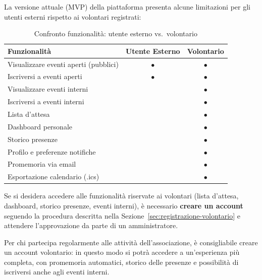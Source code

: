 \documentclass[a4paper,11pt,oneside]{book}
\begin{document}
La versione attuale (MVP) della piattaforma presenta alcune limitazioni per gli utenti esterni rispetto ai volontari registrati:

\begin{table}[htbp]
\centering
\caption{Confronto funzionalit\`a: utente esterno vs.\ volontario}
\label{tab:confronto-esterno-volontario}
\begin{tabularx}{\textwidth}{X c c}
\toprule
\textbf{Funzionalit\`a} & \textbf{Utente Esterno} & \textbf{Volontario} \\
\midrule
Visualizzare eventi aperti (pubblici)           & $\bullet$ & $\bullet$ \\
Iscriversi a eventi aperti                      & $\bullet$ & $\bullet$ \\
Visualizzare eventi interni                     &           & $\bullet$ \\
Iscriversi a eventi interni                     &           & $\bullet$ \\
Lista d'attesa                                  &           & $\bullet$ \\
Dashboard personale                             &           & $\bullet$ \\
Storico presenze                                &           & $\bullet$ \\
Profilo e preferenze notifiche                  &           & $\bullet$ \\
Promemoria via email                            &           & $\bullet$ \\
Esportazione calendario (.ics)                  &           & $\bullet$ \\
\bottomrule
\end{tabularx}
\end{table}

\begin{infobox}
Se si desidera accedere alle funzionalit\`a riservate ai volontari (lista d'attesa, dashboard, storico presenze, eventi interni), \`e necessario \textbf{creare un account} seguendo la procedura descritta nella Sezione~\ref{sec:registrazione-volontario} e attendere l'approvazione da parte di un amministratore.
\end{infobox}

\begin{tipbox}
Per chi partecipa regolarmente alle attivit\`a dell'associazione, \`e consigliabile creare un account volontario: in questo modo si potr\`a accedere a un'esperienza pi\`u completa, con promemoria automatici, storico delle presenze e possibilit\`a di iscriversi anche agli eventi interni.
\end{tipbox}
\end{document}
